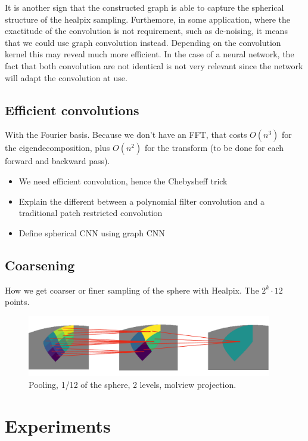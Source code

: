 \documentclass[preprint,12pt,authoryear]{elsarticle}
\newcommand{\assign}[1]{{\color[rgb]{.8,.5,.8}{Assigned: #1 }}}
\newcommand{\1}{\b{1}}              %
\newcommand{\0}{\b{0}}              %
\begin{document}
It is another sign that the constructed graph is able to capture the spherical
structure of the healpix sampling. Furthemore, in some application, where the
exactitude of the convolution is not requirement, such as de-noising, it means
that we could use graph convolution instead. Depending on the convolution kernel
this may reveal much more efficient. In the case of a neural network, the fact
that both convolution are not identical is not very relevant since the network
will adapt the convolution at use.

\subsection{Efficient convolutions}
\assign{Michaël}
With the Fourier basis. Because we don't have an FFT, that costs $O(n^3)$ for the eigendecomposition, plus $O(n^2)$ for the transform (to be done for each forward and backward pass).
\begin{itemize}
	\item We need efficient convolution, hence the Chebysheff trick
	\item Explain the different between a polynomial filter convolution and a traditional patch restricted convolution
	\item Define spherical CNN using graph CNN
\end{itemize}


\subsection{Coarsening}
\assign{Nathanaël}

How we get coarser or finer sampling of the sphere with Healpix. The $2^k \cdot 12$ points.

\begin{figure}[!ht]
\centering
\includegraphics[width=0.95\textwidth]{figures/pooling.pdf}
\caption{Pooling, 1/12 of the sphere, 2 levels, molview projection.}
\label{fig:pooling}
\end{figure}


\section{Experiments}
\end{document}
